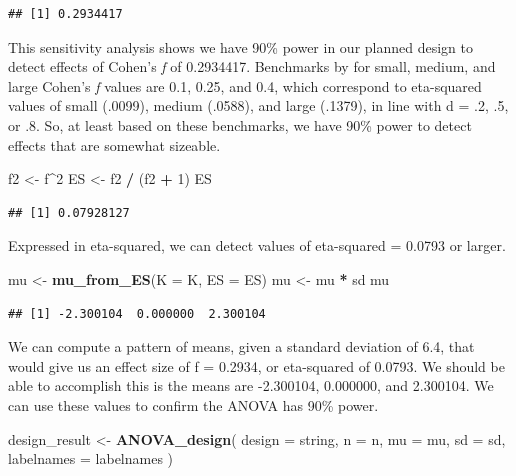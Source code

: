 \documentclass[]{book}
\newenvironment{Shaded}{\begin{snugshade}}{\end{snugshade}}
\newcommand{\DataTypeTok}[1]{\textcolor[rgb]{0.13,0.29,0.53}{#1}}
\newcommand{\DecValTok}[1]{\textcolor[rgb]{0.00,0.00,0.81}{#1}}
\newcommand{\KeywordTok}[1]{\textcolor[rgb]{0.13,0.29,0.53}{\textbf{#1}}}
\newcommand{\NormalTok}[1]{#1}
\newcommand{\OperatorTok}[1]{\textcolor[rgb]{0.81,0.36,0.00}{\textbf{#1}}}
\newcommand{\StringTok}[1]{\textcolor[rgb]{0.31,0.60,0.02}{#1}}
\begin{document}
\begin{verbatim}
## [1] 0.2934417
\end{verbatim}

This sensitivity analysis shows we have 90\% power in our planned design to detect effects of Cohen's \emph{f} of 0.2934417. Benchmarks by \citet{cohen1988spa} for small, medium, and large Cohen's \emph{f} values are 0.1, 0.25, and 0.4, which correspond to eta-squared values of small (.0099), medium (.0588), and large (.1379), in line with d = .2, .5, or .8. So, at least based on these benchmarks, we have 90\% power to detect effects that are somewhat sizeable.

\begin{Shaded}
\begin{Highlighting}[]
\NormalTok{f2 <-}\StringTok{ }\NormalTok{f}\OperatorTok{^}\DecValTok{2}
\NormalTok{ES <-}\StringTok{ }\NormalTok{f2 }\OperatorTok{/}\StringTok{ }\NormalTok{(f2 }\OperatorTok{+}\StringTok{ }\DecValTok{1}\NormalTok{)}
\NormalTok{ES}
\end{Highlighting}
\end{Shaded}

\begin{verbatim}
## [1] 0.07928127
\end{verbatim}

Expressed in eta-squared, we can detect values of eta-squared = 0.0793 or larger.

\begin{Shaded}
\begin{Highlighting}[]
\NormalTok{mu <-}\StringTok{ }\KeywordTok{mu_from_ES}\NormalTok{(}\DataTypeTok{K =}\NormalTok{ K, }\DataTypeTok{ES =}\NormalTok{ ES)}
\NormalTok{mu <-}\StringTok{ }\NormalTok{mu }\OperatorTok{*}\StringTok{ }\NormalTok{sd}
\NormalTok{mu}
\end{Highlighting}
\end{Shaded}

\begin{verbatim}
## [1] -2.300104  0.000000  2.300104
\end{verbatim}

We can compute a pattern of means, given a standard deviation of 6.4, that would give us an effect size of f = 0.2934, or eta-squared of 0.0793. We should be able to accomplish this is the means are -2.300104, 0.000000, and 2.300104. We can use these values to confirm the ANOVA has 90\% power.

\begin{Shaded}
\begin{Highlighting}[]
\NormalTok{design_result <-}\StringTok{ }\KeywordTok{ANOVA_design}\NormalTok{(}
  \DataTypeTok{design =}\NormalTok{ string,}
  \DataTypeTok{n =}\NormalTok{ n,}
  \DataTypeTok{mu =}\NormalTok{ mu,}
  \DataTypeTok{sd =}\NormalTok{ sd,}
  \DataTypeTok{labelnames =}\NormalTok{ labelnames}
\NormalTok{  )}
\end{Highlighting}
\end{Shaded}
\end{document}
